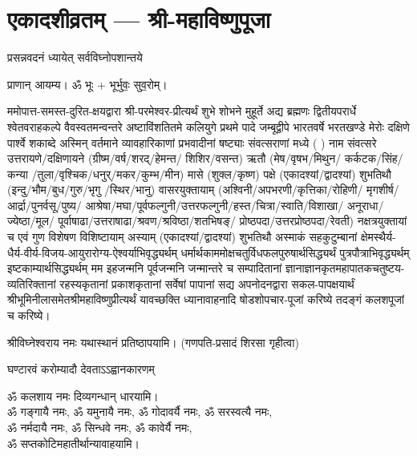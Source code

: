 
\setlength{\parindent}{0pt}

\section[एकादशीव्रतम्]{एकादशीव्रतम् — श्री-महाविष्णुपूजा}




{प्रसन्नवदनं ध्यायेत् सर्वविघ्नोपशान्तये}
 
प्राणान्  आयम्य।  ॐ भूः + भूर्भुवः॒ सुव॒रोम्।


ममोपात्त-समस्त-दुरित-क्षयद्वारा श्री-परमेश्वर-प्रीत्यर्थं शुभे शोभने मुहूर्ते अद्य ब्रह्मणः
द्वितीयपरार्धे श्वेतवराहकल्पे वैवस्वतमन्वन्तरे अष्टाविंशतितमे कलियुगे प्रथमे पादे
जम्बूद्वीपे भारतवर्षे भरतखण्डे मेरोः दक्षिणे पार्श्वे शकाब्दे अस्मिन् वर्तमाने व्यावहारिकाणां प्रभवादीनां षष्ट्याः संवत्सराणां मध्ये (	) नाम संवत्सरे उत्तरायणे/दक्षिणायने 
(ग्रीष्म/वर्ष/शरद्/हेमन्त/ शिशिर/वसन्त) ऋतौ  (मेष/वृषभ/मिथुन/
कर्कटक/सिंह/कन्या /तुला/वृश्चिक/धनुर्/मकर/कुम्भ/मीन) मासे 
(शुक्ल/कृष्ण) पक्षे (एकादश्यां/द्वादश्यां) शुभतिथौ
(इन्दु/भौम/बुध/गुरु/भृगु /स्थिर/भानु) वासरयुक्तायाम्
(अश्विनी/अपभरणी/कृत्तिका/रोहिणी/ मृगशीर्ष/आर्द्रा/पुनर्वसू/पुष्य/
आश्रेषा/मघा/पूर्वफल्गुनी/उत्तर\-फल्गुनी/हस्त/चित्रा/स्वाति/विशाखा/
अनूराधा/ज्येष्ठा/मूल/ पूर्वाषाढा/उत्तराषाढा/श्रवण/श्रविष्ठा/शतभिषङ्/
प्रोष्ठपदा/उत्तर\-प्रोष्ठपदा/रेवती) नक्षत्रयुक्तायां च एवं गुण विशेषण विशिष्टायाम्
अस्याम् (एकादश्यां/द्वादश्यां) शुभतिथौ 
अस्माकं सहकुटुम्बानां क्षेमस्थैर्य-धैर्य-वीर्य-विजय-आयुरारोग्य-ऐश्वर्याभिवृद्ध्यर्थम्
 धर्मार्थकाममोक्ष\-चतुर्विधफलपुरुषार्थसिद्ध्यर्थं पुत्रपौत्राभिवृद्ध्यर्थम् इष्टकाम्यार्थसिद्ध्यर्थम्
मम इहजन्मनि पूर्वजन्मनि जन्मान्तरे च सम्पादितानां ज्ञानाज्ञानकृतमहा\-पातकचतुष्टय-व्यतिरिक्तानां रहस्यकृतानां प्रकाशकृतानां सर्वेषां पापानां सद्य अपनोदनद्वारा सकल-पापक्षयार्थं श्रीभूमिनीलासमेतश्रीमहाविष्णुप्रीत्यर्थं यावच्छक्ति ध्यानावाहनादि 
षोडशोपचार-पूजां करिष्ये तदङ्गं कलशपूजां च करिष्ये।


श्रीविघ्नेश्वराय नमः यथास्थानं प्रतिष्ठापयामि।
(गणपति-प्रसादं शिरसा गृहीत्वा)



{घण्टारवं करोम्यादौ देवताऽऽह्वानकारणम्}

ॐ कलशाय नमः दिव्यगन्धान् धारयामि।\\
ॐ गङ्गायै नमः, ॐ यमुनायै नमः, ॐ गोदावर्यै नमः,  ॐ सरस्वत्यै नमः,\\ ॐ नर्मदायै नमः, ॐ सिन्धवे नमः, ॐ कावेर्यै नमः,\\
 ॐ सप्तकोटिमहातीर्थान्यावाहयामि। \\


